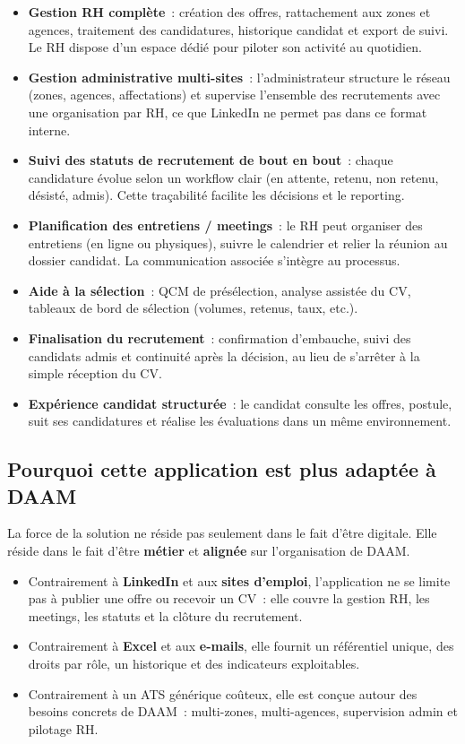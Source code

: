 \begin{itemize}
  \item \textbf{Gestion RH complète}~: création des offres, rattachement aux
        zones et agences, traitement des candidatures, historique candidat et
        export de suivi. Le RH dispose d'un espace dédié pour piloter son
        activité au quotidien.
  \item \textbf{Gestion administrative multi-sites}~: l'administrateur
        structure le réseau (zones, agences, affectations) et supervise
        l'ensemble des recrutements avec une organisation par RH, ce que
        LinkedIn ne permet pas dans ce format interne.
  \item \textbf{Suivi des statuts de recrutement de bout en bout}~: chaque
        candidature évolue selon un workflow clair (en attente, retenu,
        non retenu, désisté, admis). Cette traçabilité facilite les décisions
        et le reporting.
  \item \textbf{Planification des entretiens / meetings}~: le RH peut
        organiser des entretiens (en ligne ou physiques), suivre le calendrier
        et relier la réunion au dossier candidat. La communication associée
        s'intègre au processus.
  \item \textbf{Aide à la sélection}~: QCM de présélection, analyse assistée
        du CV, tableaux de bord de sélection (volumes, retenus, taux, etc.).
  \item \textbf{Finalisation du recrutement}~: confirmation d'embauche,
        suivi des candidats admis et continuité après la décision, au lieu
        de s'arrêter à la simple réception du CV.
  \item \textbf{Expérience candidat structurée}~: le candidat consulte les
        offres, postule, suit ses candidatures et réalise les évaluations
        dans un même environnement.
\end{itemize}


\subsection{Pourquoi cette application est plus adaptée à DAAM}

La force de la solution ne réside pas seulement dans le fait d'être
\og{}digitale\fg{}. Elle réside dans le fait d'être \textbf{métier} et
\textbf{alignée} sur l'organisation de DAAM.

\begin{itemize}
  \item Contrairement à \textbf{LinkedIn} et aux \textbf{sites d'emploi},
        l'application ne se limite pas à publier une offre ou recevoir un CV~:
        elle couvre la gestion RH, les meetings, les statuts et la clôture
        du recrutement.
  \item Contrairement à \textbf{Excel} et aux \textbf{e-mails}, elle fournit
        un référentiel unique, des droits par rôle, un historique et des
        indicateurs exploitables.
  \item Contrairement à un ATS générique coûteux, elle est conçue autour des
        besoins concrets de DAAM~: multi-zones, multi-agences, supervision
        admin et pilotage RH.
\end{itemize}

